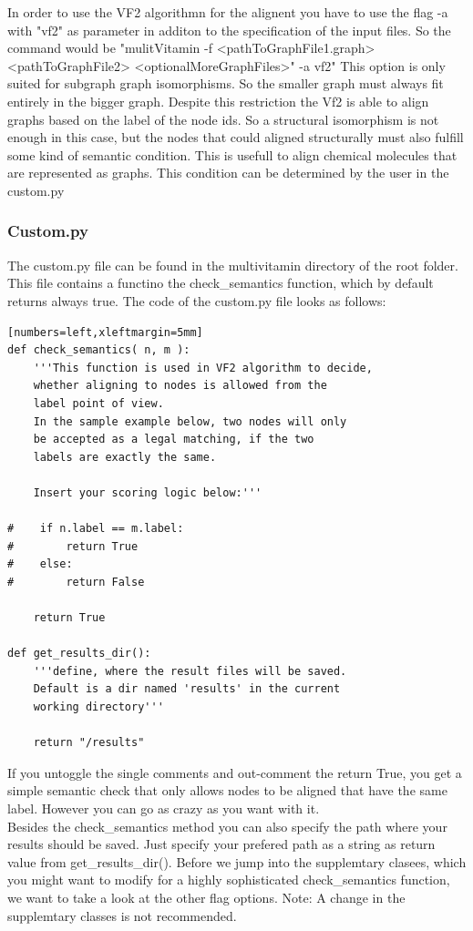 \documentclass{SeminarV2}
\begin{document}
In order to use the VF2 algorithmn for the alignent you have to use the flag
-a with  "vf2" as parameter in additon to the specification of the input files. So the command would be
"mulitVitamin -f <pathToGraphFile1.graph> <pathToGraphFile2> <optionalMoreGraphFiles>" -a vf2"
This option is only suited for subgraph graph isomorphisms. So the smaller graph
must always fit entirely in the bigger graph. Despite this restriction the
Vf2 is able to align graphs based on the label of the node ids. So a structural
isomorphism is not enough in this case, but the nodes that could aligned
structurally must also fulfill some kind of semantic condition. This is
usefull to align chemical molecules that are represented as graphs.
This condition can be determined by the user in the custom.py

\subsubsection{Custom.py}
The custom.py file can be found in the multivitamin directory of the root folder.
This file contains a functino the check\_semantics function, which by default
returns always true. The code of the custom.py file looks as follows:
\begin{verbatim}[numbers=left,xleftmargin=5mm]
def check_semantics( n, m ):
    '''This function is used in VF2 algorithm to decide,
    whether aligning to nodes is allowed from the
    label point of view.
    In the sample example below, two nodes will only
    be accepted as a legal matching, if the two
    labels are exactly the same.

    Insert your scoring logic below:'''

#    if n.label == m.label:
#        return True
#    else:
#        return False

    return True

def get_results_dir():
    '''define, where the result files will be saved.
    Default is a dir named 'results' in the current
    working directory'''

    return "/results"
\end{verbatim}

If you untoggle the single comments and out-comment the return True, you get a simple
semantic check that only allows nodes to be aligned that have the same label.
However you can go as crazy as you want with it.\\
Besides the check\_semantics method you can also specify the path where your
results should be saved. Just specify your prefered path as a string as return
value from get\_results\_dir(). Before we jump into the supplemtary clasees, which
you might want to modify for a highly sophisticated check\_semantics function, we
want to take a look at the other flag options.
Note: A change in the supplemtary classes is not recommended.
\end{document}
